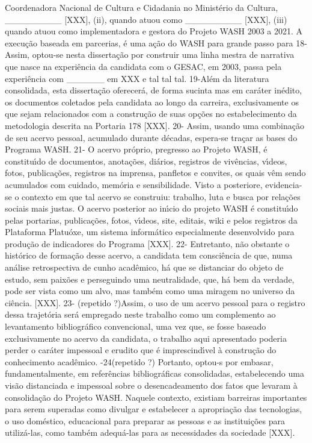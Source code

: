 \documentclass[
12pt,		%
openright,	%
twoside,  %
a4paper,			%
chapter=TITLE,		%
english,			%
french,				%
spanish,			%
brazil				%
]{USPSC-classe/USPSC}
\begin{document}
Coordenadora Nacional de Cultura e Cidadania no Minist\'erio da Cultura,   \_\_\_\_\_\_\_\_\_ [XXX], (ii), quando atuou como \_\_\_\_\_\_\_\_\_ [XXX], (iii) quando atuou como implementadora e gestora do Projeto WASH 2003 a 2021.
A execu\c{c}\~ao baseada em parcerias, \'e uma a\c{c}\~ao do WASH para grande passo para
18-  Assim, optou-se nesta disserta\c{c}\~ao por construir uma linha mestra de narrativa que nasce na experi\^encia da candidata com o GESAC, em 2003, passa pela experi\^encia com \_\_\_\_\_\_ em XXX e tal tal tal.
 19-Al\'em da literatura consolidada, esta disserta\c{c}\~ao oferecer\'a, de forma sucinta mas em car\'ater in\'edito, os documentos coletados pela candidata ao longo da carreira, exclusivamente os que sejam relacionados com a constru\c{c}\~ao de suas op\c{c}\~oes no estabelecimento da metodologia descrita na Portaria 178 [XXX].
20- Assim, usando uma combina\c{c}\~ao de seu acervo pessoal, acumulado durante d\'ecadas, espera-se tra\c{c}ar as bases do Programa WASH.
21-  O acervo pr\'oprio, pregresso ao Projeto WASH, \'e constitu\'{\i}do de documentos, anota\c{c}\~oes, di\'arios, registros de viv\^encias, v\'{\i}deos, fotos, publica\c{c}\~oes, registros na imprensa, panfletos e convites, os quais v\^em sendo acumulados com cuidado, mem\'oria e sensibilidade. Visto a posteriore, evidencia-se o contexto em que tal acervo se construiu: trabalho, luta e busca por rela\c{c}\~oes sociais mais justas. O acervo posterior ao in\'{\i}cio do projeto WASH \'e constitu\'{\i}do pelas portarias, publica\c{c}\~oes, fotos, v\'{\i}deos, site, editais, wiki e pelos registros da Plataforma Platu\'oxe, um sistema inform\'atico especialmente desenvolvido para produ\c{c}\~ao de indicadores do Programa [XXX].
22- Entretanto, n\~ao obstante o hist\'orico de forma\c{c}\~ao desse acervo, a candidata tem consci\^encia de que, numa an\'alise retrospectiva de cunho acad\^emico, h\'a que se distanciar do objeto de estudo, sem paix\~oes e perseguindo uma neutralidade, que, h\'a bem da verdade, pode ser vista como um alvo, mas tamb\'em como uma miragem no universo da ci\^encia. [XXX].
23- (repetido ?)Assim, o uso de um acervo pessoal para o registro dessa trajet\'oria ser\'a empregado neste trabalho como um complemento ao levantamento bibliogr\'afico convencional, uma vez que, se fosse baseado exclusivamente no acervo da candidata, o trabalho aqui apresentado poderia perder o car\'ater impessoal e erudito que \'e imprescind\'{\i}vel \`a constru\c{c}\~ao do conhecimento acad\^emico.
-24(repetido ?) Portanto, optou-s por embasar, fundamentalmente, em refer\^encias bibliogr\'aficas consolidadas, estabelecendo uma vis\~ao distanciada e impessoal sobre o desencadeamento dos fatos que levaram \`a consolida\c{c}\~ao do Projeto WASH.
Naquele contexto, existiam barreiras importantes para serem superadas como divulgar e estabelecer a apropria\c{c}\~ao das tecnologias, o uso dom\'estico, educacional para preparar as pessoas e as institui\c{c}\~oes para utiliz\'a-las, como tamb\'em adequ\'a-las para as necessidades da sociedade [XXX].
\end{document}
